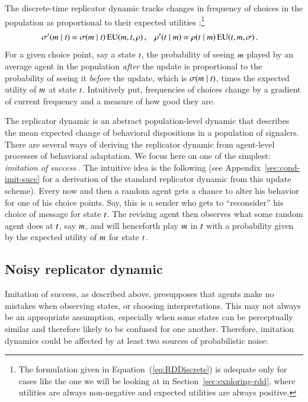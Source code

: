 \documentclass[fleqn,reqno,10pt]{article}
\begin{document}
The discrete-time replicator dynamic tracks changes in frequency of choices in the population
as proportional to their expected utilities
\citep[e.g.][]{HofbauerSigmund1998:Evolutionary-Ga}:\footnote{The formulation given in
  Equation~(\ref{eq:RDDiscrete}) is adequate only for cases like the one we will be looking at
  in Section~\ref{sec:exploring-rdd}, where utilities are always non-negative and expected
  utilities are always positive.}
\begin{align}
  \label{eq:RDDiscrete}
  \sigma'(m \mid t) & \propto \sigma(m \mid t) \thinspace
    \mathrm{EU}(m, t,\rho)\,, & \rho'(t \mid m) & \propto \rho(t \mid m) \thinspace
    \mathrm{EU}(t, m,\sigma)\,.   
\end{align}
For a given choice point, say a state $t$, the probability of seeing $m$ played by an
average agent in the population \emph{after} the update is proportional to the probability of
seeing it \emph{before} the update, which is $\sigma(m \mid t)$, times the
expected utility of $m$ at state $t$. Intuitively put, frequencies of choices change
by a gradient of current frequency and a measure of how good they are.

The replicator dynamic is an abstract population-level dynamic that describes the mean expected
change of behavioral dispositions in a population of signalers. There are several ways of
deriving the replicator dynamic from agent-level processes of behavioral adaptation. We focus
here on one of the simplest: \emph{imitation of success}
\citep[see][]{Sandholm2010:Population-Game}. The intuitive idea is the following (see
Appendix~\ref{sec:cond-imit-succ} for a derivation of the standard replicator dynamic from this
update scheme).  Every now and then a random agent gets a chance to alter his behavior for one
of his choice points. Say, this is a sender who gets to ``reconsider'' his choice of message
for state $t$. The revising agent then observes what some random agent does at $t$,
say $m$, and will henceforth play $m$ in $t$ with a probability given by the
expected utility of $m$ for state $t$.

\subsection{Noisy replicator dynamic}
\label{sec:noisy-repl-dynam}

Imitation of success, as described above, presupposes that agents make no mistakes when
observing states, or choosing interpretations. This may not always be an appropriate
assumption, especially when some states can be perceptually similar and therefore likely to be
confused for one another. Therefore, imitation dynamics could be affected by at least two
sources of probabilistic noise:
\end{document}
